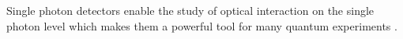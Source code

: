 Single photon detectors enable the study of optical interaction on the single photon level which makes them a powerful
tool for many quantum experiments \cite{charaev-2023}.
%
%
%
